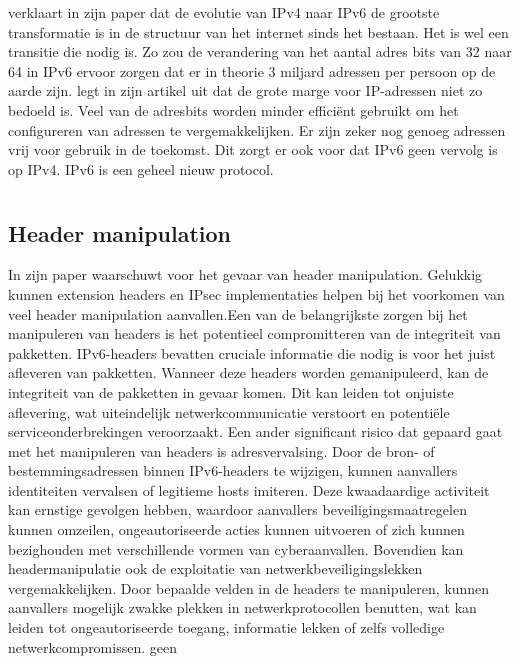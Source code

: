 \textcite{bilski2011ipv4} verklaart in zijn paper dat de evolutie van IPv4 naar IPv6 de grootste transformatie is in de structuur van het internet sinds het bestaan. Het is wel een transitie die nodig is. Zo zou de verandering van het aantal adres bits van 32 naar 64 in IPv6 ervoor zorgen dat er in theorie 3 miljard adressen per persoon op de aarde zijn. \textcite{andress2005ipv6} legt in zijn artikel uit dat de grote marge voor IP-adressen niet zo bedoeld is. Veel van de adresbits worden minder efficiënt gebruikt om het configureren van adressen te vergemakkelijken. Er zijn zeker nog genoeg adressen vrij voor gebruik in de toekomst. \autocite{andress2005ipv6} Dit zorgt er ook voor dat IPv6 geen vervolg is op IPv4. IPv6 is een geheel nieuw protocol. 

\section{}%
\label{sec:De problemen met IPv6?}

\subsection{Header manipulation}
In zijn paper waarschuwt \textcite{sotillo2006ipv6} voor het gevaar van header manipulation. Gelukkig kunnen extension headers en IPsec implementaties helpen bij het voorkomen van veel header manipulation aanvallen.Een van de belangrijkste zorgen bij het manipuleren van headers is het potentieel compromitteren van de integriteit van pakketten. IPv6-headers bevatten cruciale informatie die nodig is voor het juist afleveren van pakketten. Wanneer deze headers worden gemanipuleerd, kan de integriteit van de pakketten in gevaar komen. Dit kan leiden tot onjuiste aflevering, wat uiteindelijk netwerkcommunicatie verstoort en potentiële serviceonderbrekingen veroorzaakt. \autocite{dawood2012ipv6} Een ander significant risico dat gepaard gaat met het manipuleren van headers is adresvervalsing. Door de bron- of bestemmingsadressen binnen IPv6-headers te wijzigen, kunnen aanvallers identiteiten vervalsen of legitieme hosts imiteren. Deze kwaadaardige activiteit kan ernstige gevolgen hebben, waardoor aanvallers beveiligingsmaatregelen kunnen omzeilen, ongeautoriseerde acties kunnen uitvoeren of zich kunnen bezighouden met verschillende vormen van cyberaanvallen.
Bovendien kan headermanipulatie ook de exploitatie van netwerkbeveiligingslekken vergemakkelijken. Door bepaalde velden in de headers te manipuleren, kunnen aanvallers mogelijk zwakke plekken in netwerkprotocollen benutten, wat kan leiden tot ongeautoriseerde toegang, informatie lekken of zelfs volledige netwerkcompromissen. geen\autocite{6726061}

